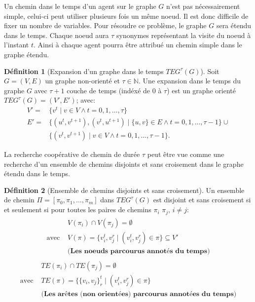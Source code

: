 \documentclass[french, 12pt, letterpaper]{article}
\theoremstyle{definition}
\newtheorem{definition}{Définition}[subsection]
\theoremstyle{proposition}
\theoremstyle{example}
\begin{document}
    Un chemin dans le temps d'un agent sur le graphe $G$ n'est pas nécessairement simple, celui-ci peut utiliser plusieurs fois un même noeud.
    Il est donc difficile de fixer un nombre de variables.
    Pour résoudre ce problème, le graphe $G$ sera étendu dans le temps. 
    Chaque noeud aura $\tau$ synonymes représentant la visite du noeud à l'instant $t$.
    Ainsi à chaque agent pourra être attribué un chemin simple dans le graphe étendu.

    \begin{definition}[Expansion d'un graphe dans le temps $TEG^\tau(G)$]
        Soit $G = ( V, E )$ un graphe non-orienté et $\tau\in \mathbb{N}$. 
        Une expansion dans le temps du graphe $G$ avec $\tau + 1$ couche de temps (indéxé de $0$ à $\tau$) est un graphe orienté
        $TEG^\tau(G) = ( V', E' )$; avec:
        \begin{align*}
            V' = &\{v^t\;|\;v \in V \land t = 0, 1, \ldots, \tau\}\\
            E' = &\{( u^t, v^{t+1} ), ( v^t, u^{t+1} )\;|\;\{u, v\}\in E \land t= 0, 1, \ldots, \tau - 1\} \cup\\
            &\{( v^t, v^{t+1} )\;|\;v\in V \land t= 0, 1, \ldots, \tau - 1\}.
        \end{align*} 
    \end{definition}

    La recherche coopérative de chemin de durée $\tau$ peut être vue comme une recherche d'un ensemble de chemins disjoints et sans croisement
    dans le graphe étendu dans le temps.

    \begin{definition}[Ensemble de chemins disjoints et sans croisement]
        Un ensemble de chemin $\Pi = [\pi_0, \pi_1, \ldots, \pi_m]$ dans $TEG^\tau(G)$ est disjoint et sans croisement si et seulement si
        pour toutes les paires de chemins $\pi_i$ $\pi_j$, $i \neq j$:
        \begin{gather}
            \label{def:chemindisjoint}
            \begin{split}
            &V(\pi_i) \cap V(\pi_j) = \emptyset\\
            \text{avec } &V(\pi) = \{v_i^t, v_j^r\;|\;( v_i^t, v_j^r ) \in \pi\} \subseteq V'\\
            &\textbf{(Les noeuds parcourus annotés du temps)}
            \end{split}
        \end{gather}
        \begin{gather}
            \label{def:chemincroisement}
            \begin{split}
            &TE(\pi_i) \cap TE(\pi_j) = \emptyset\\
            \text{avec } &TE(\pi) = \{\{v_i, v_j\}^t_r  \;|\; ( v_i^t, v_j^r ) \in \pi \}\\
            &\textbf{(Les arêtes (non orientées) parcourus annotées du temps)}
            \end{split}
        \end{gather}
    \end{definition}
\end{document}

